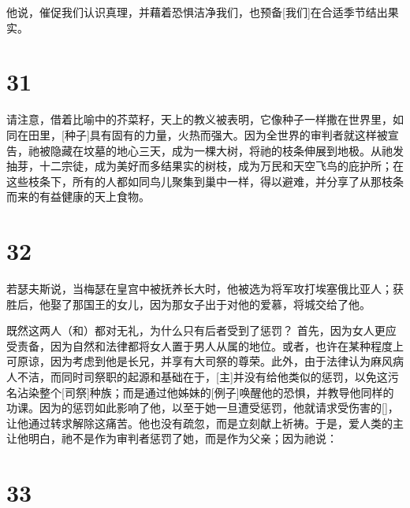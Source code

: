   他说，催促我们认识真理，并藉着恐惧洁净我们，也预备[我们]在合适季节结出果实。\par


\section{31}

请注意，借着比喻中的芥菜籽，天上的教义被表明，它像种子一样撒在世界里，如同在田里，[种子]具有固有的力量，火热而强大。因为全世界的审判者就这样被宣告，祂被隐藏在坟墓的地心三天，成为一棵大树，将祂的枝条伸展到地极。从祂发抽芽，十二宗徒，成为美好而多结果实的树枝，成为万民和天空飞鸟的庇护所；在这些枝条下，所有的人都如同鸟儿聚集到巢中一样，得以避难，并分享了从那枝条而来的有益健康的天上食物。\par


\section{32}

若瑟夫斯说，当梅瑟在皇宫中被抚养长大时，他被选为将军攻打埃塞俄比亚人；获胜后，他娶了那国王的女儿，因为那女子出于对他的爱慕，将城交给了他。\par

既然这两人（和）都对无礼，为什么只有后者受到了惩罚？ 首先，因为女人更应受责备，因为自然和法律都将女人置于男人从属的地位。或者，也许在某种程度上可原谅，因为考虑到他是长兄，并享有大司祭的尊荣。此外，由于法律认为麻风病人不洁，而同时司祭职的起源和基础在于，[主]并没有给他类似的惩罚，以免这污名沾染整个[司祭]种族；而是通过他姊妹的[例子]唤醒他的恐惧，并教导他同样的功课。因为的惩罚如此影响了他，以至于她一旦遭受惩罚，他就请求受伤害的[]，让他通过转求解除这痛苦。他也没有疏忽，而是立刻献上祈祷。于是，爱人类的主让他明白，祂不是作为审判者惩罚了她，而是作为父亲；因为祂说：\par


\section{33}

